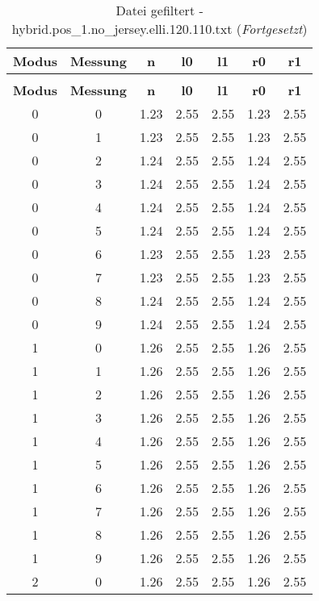 \begin{longtable}{|c|c||c||c|c||c|c|}
	\caption{Datei gefiltert - hybrid.pos\_1.no\_jersey.elli.120.110.txt} \label{tab:hybrid.pos-1.no-jersey.elli.120.110.txt} \\ \hline
	\textbf{Modus} & \textbf{Messung} & \textbf{n} & \textbf{l0} & \textbf{l1} & \textbf{r0} & \textbf{r1}\\ \hline
	\endfirsthead
	\caption[]{Datei gefiltert - hybrid.pos\_1.no\_jersey.elli.120.110.txt (\emph{Fortgesetzt})} \\ \hline
	\textbf{Modus} & \textbf{Messung} & \textbf{n} & \textbf{l0} & \textbf{l1} & \textbf{r0} & \textbf{r1}\\ \hline
	\endhead
	0 & 0 & 1.23 & 2.55 & 2.55 & 1.23 & 2.55 \\ \hline
	0 & 1 & 1.23 & 2.55 & 2.55 & 1.23 & 2.55 \\ \hline
	0 & 2 & 1.24 & 2.55 & 2.55 & 1.24 & 2.55 \\ \hline
	0 & 3 & 1.24 & 2.55 & 2.55 & 1.24 & 2.55 \\ \hline
	0 & 4 & 1.24 & 2.55 & 2.55 & 1.24 & 2.55 \\ \hline
	0 & 5 & 1.24 & 2.55 & 2.55 & 1.24 & 2.55 \\ \hline
	0 & 6 & 1.23 & 2.55 & 2.55 & 1.23 & 2.55 \\ \hline
	0 & 7 & 1.23 & 2.55 & 2.55 & 1.23 & 2.55 \\ \hline
	0 & 8 & 1.24 & 2.55 & 2.55 & 1.24 & 2.55 \\ \hline
	0 & 9 & 1.24 & 2.55 & 2.55 & 1.24 & 2.55 \\ \hline
	1 & 0 & 1.26 & 2.55 & 2.55 & 1.26 & 2.55 \\ \hline
	1 & 1 & 1.26 & 2.55 & 2.55 & 1.26 & 2.55 \\ \hline
	1 & 2 & 1.26 & 2.55 & 2.55 & 1.26 & 2.55 \\ \hline
	1 & 3 & 1.26 & 2.55 & 2.55 & 1.26 & 2.55 \\ \hline
	1 & 4 & 1.26 & 2.55 & 2.55 & 1.26 & 2.55 \\ \hline
	1 & 5 & 1.26 & 2.55 & 2.55 & 1.26 & 2.55 \\ \hline
	1 & 6 & 1.26 & 2.55 & 2.55 & 1.26 & 2.55 \\ \hline
	1 & 7 & 1.26 & 2.55 & 2.55 & 1.26 & 2.55 \\ \hline
	1 & 8 & 1.26 & 2.55 & 2.55 & 1.26 & 2.55 \\ \hline
	1 & 9 & 1.26 & 2.55 & 2.55 & 1.26 & 2.55 \\ \hline
	2 & 0 & 1.26 & 2.55 & 2.55 & 1.26 & 2.55 \\ \hline

\end{longtable}
